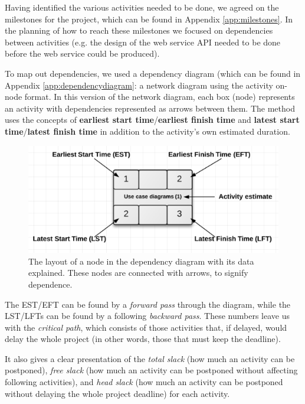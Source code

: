 Having identified the various activities needed to be done, we agreed on the milestones for the project, which can be found in Appendix \ref{app:milestones}.
In the planning of how to reach these milestones we focused on dependencies
between activities (e.g. the design of the web service API needed to be done before the
web service could be produced).

To map out dependencies, we used a dependency diagram (which can be found in Appendix
\ref{app:dependencydiagram}: a network diagram using the activity on-node format\cite{caye}.
In this version of the network diagram, each box (node) represents an activity with
dependencies represented as arrows between them. The method uses the concepts of
\textbf{earliest start time}/\textbf{earliest finish time} and \textbf{latest start
time}/\textbf{latest finish time} in addition to the activity’s own estimated duration.

\begin{figure}[hbtp]
   \centering
    \includegraphics[scale=0.5]{./Empiri/Planning/img/networkdiagramnotation.png}
    \caption{The layout of a node in the dependency diagram with its data explained. These nodes are connected with arrows, to signify dependence.}
\end{figure}
 
The EST/EFT can be found by a \emph{forward pass} through the diagram, while the LST/LFTs
can be found by a following \emph{backward pass}. These numbers leave us with the
\emph{critical path}, which consists of those activities that, if delayed, would delay
the whole project (in other words, those that must keep the deadline).

It also gives a clear presentation of the \emph{total slack} (how much an activity can
be postponed), \emph{free slack} (how much an activity can be postponed without affecting
following activities), and \emph{head slack} (how much an activity can be postponed without
delaying the whole project deadline) for each activity.